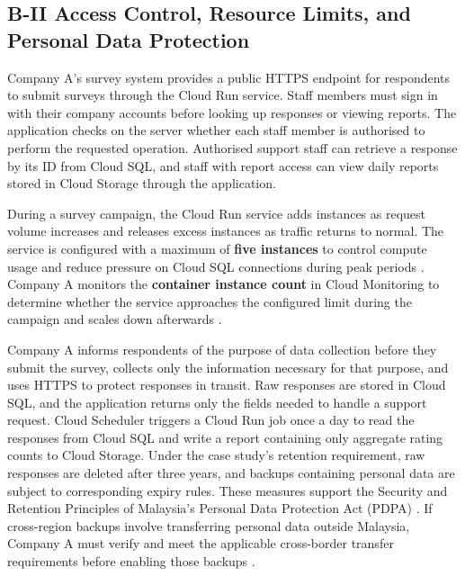 \subsection{B-II Access Control, Resource Limits, and Personal Data Protection}

Company A's survey system provides a public HTTPS endpoint for
respondents to submit surveys through the Cloud Run service. Staff
members must sign in with their company accounts before looking up
responses or viewing reports. The application checks on the server
whether each staff member is authorised to perform the requested
operation. Authorised support staff can retrieve a response by its ID
from Cloud SQL, and staff with report access can view daily reports
stored in Cloud Storage through the application.

During a survey campaign, the Cloud Run service adds instances as
request volume increases and releases excess instances as traffic
returns to normal. The service is configured with a maximum of
\textbf{five instances} to control compute usage and reduce pressure
on Cloud SQL connections during peak periods
\parencite{cloud-run-max-instances}. Company A monitors the
\textbf{container instance count} in Cloud Monitoring to determine
whether the service approaches the configured limit during the
campaign and scales down afterwards \parencite{cloud-run-monitoring}.

Company A informs respondents of the purpose of data collection before
they submit the survey, collects only the information necessary for
that purpose, and uses HTTPS to protect responses in transit. Raw
responses are stored in Cloud SQL, and the application returns only
the fields needed to handle a support request. Cloud Scheduler
triggers a Cloud Run job once a day to read the responses from Cloud
SQL and write a report containing only aggregate rating counts to
Cloud Storage. Under the case study's retention requirement, raw
responses are deleted after three years, and backups containing
personal data are subject to corresponding expiry rules. These
measures support the Security and Retention Principles of Malaysia's
Personal Data Protection Act (PDPA) \parencite{pdpa-principles}. If
cross-region backups involve transferring personal data outside
Malaysia, Company A must verify and meet the applicable cross-border
transfer requirements before enabling those backups
\parencite{pdpa-cross-border}.
